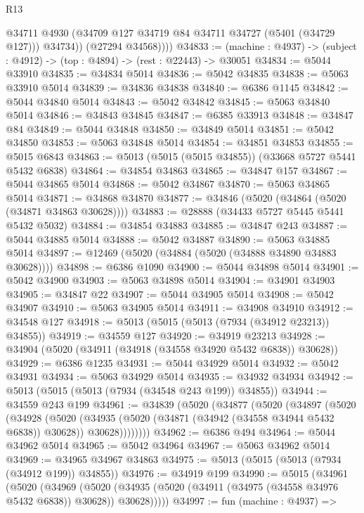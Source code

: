\begin{lexlean}{R13}
\begin{coremodule}
              @34711
              @4930
              (@34709 @127 @34719 @84 @34711 @34727 (@5401 (@34729 @127)))
              @34734))
          (@27294 @34568))))
@34833 := (machine : @4937) -> (subject : @4912) -> (top : @4894) -> (rest : @22443) -> @30051
@34834 := @5044 @33910
@34835 := @34834 @5014
@34836 := @5042 @34835
@34838 := @5063 @33910 @5014
@34839 := @34836 @34838
@34840 := @6386 @1145
@34842 := @5044 @34840 @5014
@34843 := @5042 @34842
@34845 := @5063 @34840 @5014
@34846 := @34843 @34845
@34847 := @6385 @33913
@34848 := @34847 @84
@34849 := @5044 @34848
@34850 := @34849 @5014
@34851 := @5042 @34850
@34853 := @5063 @34848 @5014
@34854 := @34851 @34853
@34855 := @5015 @6843
@34863 := @5013 (@5015 (@5015 @34855)) (@33668 @5727 @5441 @5432 @6838)
@34864 := @34854 @34863
@34865 := @34847 @157
@34867 := @5044 @34865 @5014
@34868 := @5042 @34867
@34870 := @5063 @34865 @5014
@34871 := @34868 @34870
@34877 := @34846 (@5020 (@34864 (@5020 (@34871 @34863 @30628))))
@34883 := @28888 (@34433 @5727 @5445 @5441 @5432 @5032)
@34884 := @34854 @34883
@34885 := @34847 @243
@34887 := @5044 @34885 @5014
@34888 := @5042 @34887
@34890 := @5063 @34885 @5014
@34897 := @12469 (@5020 (@34884 (@5020 (@34888 @34890 @34883 @30628))))
@34898 := @6386 @1090
@34900 := @5044 @34898 @5014
@34901 := @5042 @34900
@34903 := @5063 @34898 @5014
@34904 := @34901 @34903
@34905 := @34847 @22
@34907 := @5044 @34905 @5014
@34908 := @5042 @34907
@34910 := @5063 @34905 @5014
@34911 := @34908 @34910
@34912 := @34548 @127
@34918 := @5013 (@5015 (@5013 (@7934 (@34912 @23213)) @34855))
@34919 := @34559 @127
@34920 := @34919 @23213
@34928 := @34904 (@5020 (@34911 (@34918 (@34558 @34920 @5432 @6838)) @30628))
@34929 := @6386 @1235
@34931 := @5044 @34929 @5014
@34932 := @5042 @34931
@34934 := @5063 @34929 @5014
@34935 := @34932 @34934
@34942 := @5013 (@5015 (@5013 (@7934 (@34548 @243 @199)) @34855))
@34944 := @34559 @243 @199
@34961 := @34839
    (@5020
      (@34877
        (@5020
          (@34897
            (@5020
              (@34928
                (@5020
                  (@34935
                    (@5020 (@34871 (@34942 (@34558 @34944 @5432 @6838)) @30628))
                    @30628))))))))
@34962 := @6386 @494
@34964 := @5044 @34962 @5014
@34965 := @5042 @34964
@34967 := @5063 @34962 @5014
@34969 := @34965 @34967 @34863
@34975 := @5013 (@5015 (@5013 (@7934 (@34912 @199)) @34855))
@34976 := @34919 @199
@34990 := @5015
    (@34961
      (@5020
        (@34969
          (@5020 (@34935 (@5020 (@34911 (@34975 (@34558 @34976 @5432 @6838)) @30628)) @30628)))))
@34997 := fun (machine : @4937) =>

\end{coremodule}
\end{lexlean}
